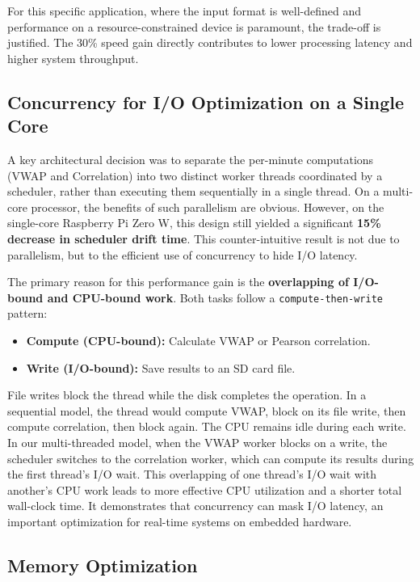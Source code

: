 \documentclass[12pt,a4paper]{article}
\begin{document}
For this specific application, where the input format is well-defined and performance on a resource-constrained device is paramount, the trade-off is justified. The 30\% speed gain directly contributes to lower processing latency and higher system throughput.

\subsection{Concurrency for I/O Optimization on a Single Core}
\label{sec:Concurrency on Single Core}

A key architectural decision was to separate the per-minute computations (VWAP and Correlation) into two distinct worker threads coordinated by a scheduler, rather than executing them sequentially in a single thread. On a multi-core processor, the benefits of such parallelism are obvious. However, on the single-core Raspberry Pi Zero W, this design still yielded a significant \textbf{15\% decrease in scheduler drift time}. This counter-intuitive result is not due to parallelism, but to the efficient use of concurrency to hide I/O latency.

The primary reason for this performance gain is the \textbf{overlapping of I/O-bound and CPU-bound work}. Both tasks follow a \texttt{compute-then-write} pattern:
\begin{itemize}
    \item \textbf{Compute (CPU-bound):} Calculate VWAP or Pearson correlation.
    \item \textbf{Write (I/O-bound):} Save results to an SD card file.
\end{itemize}

File writes block the thread while the disk completes the operation. In a sequential model, the thread would compute VWAP, block on its file write, then compute correlation, then block again. The CPU remains idle during each write. In our multi-threaded model, when the VWAP worker blocks on a write, the scheduler switches to the correlation worker, which can compute its results during the first thread’s I/O wait. This overlapping of one thread’s I/O wait with another’s CPU work leads to more effective CPU utilization and a shorter total wall-clock time. It demonstrates that concurrency can mask I/O latency, an important optimization for real-time systems on embedded hardware.

\subsection{Memory Optimization}
\end{document}
